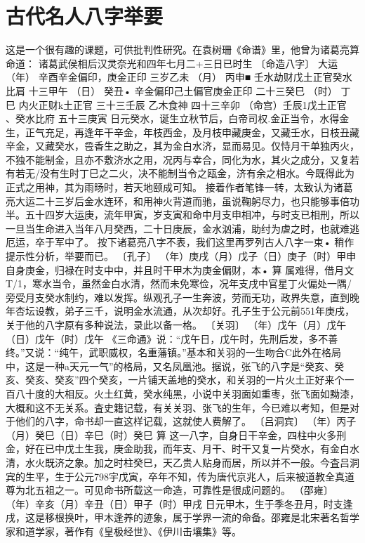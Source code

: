 \section{古代名人八字举要}
这是一个很有趣的课题，可供批判性研究。在袁树珊《命谱》里，他曾为诸葛亮算命道：
诸葛武侯相后汉灵奈光和四年七月二+三日已时生
〔命造八字〕	大运
（年）	辛酉辛金偏印，庚金正印		三岁乙未
（月）	丙申■	壬水劫财戊土正官癸水比肩	十三甲午
（日）	癸丑•	{辛金偏印己土偏官庚金正印	二十三癸巳
（时）	丁巳	{内火正财k土正官	三十三壬辰
乙木食神	四十三辛卯
（命宫）壬辰1戊土正官
、癸水比府	五十三庚寅
日元癸水，诞生立秋节后，白帝司权.金正当令，水得金生，正气充足，再逢年干辛金，年枝西金，及月枝申藏庚金，又藏壬水，日枝丑藏辛金，又藏癸水，卺香生之助之，其为金白水济，显而易见。仅恃月干单独丙火，不独不能制金，且亦不敷济水之用，况丙与幸合，同化为水，其火之成分，又复若有若无/没有生时丁巳之二火，决不能制当令之瓯金，济有余之相水。今既得此为正式之用神，其为雨旸时，若天地颐成可知。
接着作者笔锋一转，太致认为诸葛亮大运二十三岁后金水连环，和用神火背道而驰，虽说鞠躬尽力，也只能够事倍功半。五十四岁大运庚，流年甲寅，岁支寅和命中月支申相冲，与时支已相刑，所以一旦当生命进入当年八月癸西，二十日庚辰，金水汹浦，助纣为虐之时，也就难逃厄运，卒于军中了。
按下诸葛亮八字不表，我们这里再罗列古人八字一束•
稍作提示性分析，举要而已。
〔孔子〕
（年）庚戌（月）戊子（日）庚子（时）甲申
自身庚金，归禄在时支中中，并且时干甲木为庚金偏财，本•
算
属难得，借月文T/1，寒水当令，虽然金白水清，然而未免寒俭，况年支戌中官星丁火偏处一隅/旁受月支癸水制约，难以发挥。纵观孔子一生奔波，劳而无功，政界失意，直到晚年杏坛设教，弟子三千，说明金水流通，从次却好。孔子生于公元前551年庚戌，关于他的八字原有多种说法，录此以备一格。
〔关羽〕
（年）戊午（月）戊午（日）戊午（时）戊午
《三命通》说：“戊午日，戊午时，先刑后发，多不善终。”又说：“纯午，武职威权，名重藩镇。”基本和关羽的一生吻合C此外在格局中，这是一种a天元一气”的格局，又名凤凰池。据说，张飞的八字是“癸亥、癸亥、癸亥、癸亥”四个癸亥，一片铺天盖地的癸水，和关羽的一片火土正好来个一百八十度的大相反。火土红黄，癸水纯黑，小说中关羽面如重枣，张飞面如黝漆，大概和这不无关系。査史籍记载，有关关羽、张飞的生年，今已难以考知，但是对于他们的八字，命书却一直这样记载，这就使人费解了。
〔吕洞宾〕
（年）丙子（月）癸巳（日）辛巳（时）癸巳
算
这一八字，自身日干辛金，四柱中火多刑金，好在已中戊土生我，庚金助我，而年支、月干、时干又复一片癸水，有金白水清，水火既济之象。加之时柱癸巳，天乙贵人贴身而居，所以并不一般。今査吕洞宾的生平，生于公元798宇戊寅，卒年不知，传为唐代京兆人，后来被道教全真道尊为北五祖之一。可见命书所载这一命造，可靠性是很成问题的。
（邵雍〕
（年）辛亥（月）辛丑（日）甲子（时）甲戌
日元甲木，生于季冬丑月，时支逢戌，这是移根换叶，甲木逢养的迹象，属于学界一流的命备。邵雍是北宋著名哲学家和道学家，著作有《皇极经世》、《伊川击壤集》等。
}}
